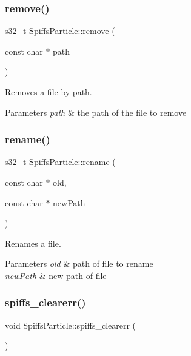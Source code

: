 \subsubsection{\texorpdfstring{remove()}{remove()}}
{\footnotesize\ttfamily s32\+\_\+t Spiffs\+Particle\+::remove (\begin{DoxyParamCaption}\item[{const char $\ast$}]{path }\end{DoxyParamCaption})\hspace{0.3cm}{\ttfamily [inline]}}



Removes a file by path. 


\begin{DoxyParams}{Parameters}
{\em path} & the path of the file to remove \\
\hline
\end{DoxyParams}
\mbox{\label{class_spiffs_particle_ad016729fc6bc5560ddb5e5faba089b4f}} 
\subsubsection{\texorpdfstring{rename()}{rename()}}
{\footnotesize\ttfamily s32\+\_\+t Spiffs\+Particle\+::rename (\begin{DoxyParamCaption}\item[{const char $\ast$}]{old,  }\item[{const char $\ast$}]{new\+Path }\end{DoxyParamCaption})\hspace{0.3cm}{\ttfamily [inline]}}



Renames a file. 


\begin{DoxyParams}{Parameters}
{\em old} & path of file to rename \\
\hline
{\em new\+Path} & new path of file \\
\hline
\end{DoxyParams}
\mbox{\label{class_spiffs_particle_af89255deb61819ea561163652784dcf1}} 
\subsubsection{\texorpdfstring{spiffs\+\_\+clearerr()}{spiffs\_clearerr()}}
{\footnotesize\ttfamily void Spiffs\+Particle\+::spiffs\+\_\+clearerr (\begin{DoxyParamCaption}{ }\end{DoxyParamCaption})\hspace{0.3cm}{\ttfamily [inline]}}



